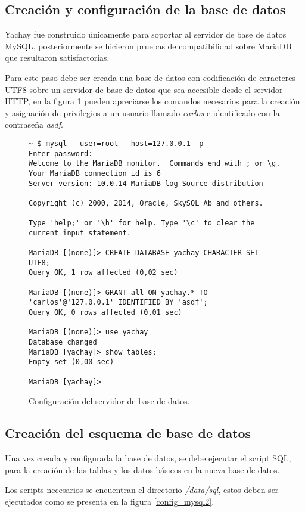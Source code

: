 \subsection{Creación y configuración de la base de datos}
Yachay fue construido únicamente para soportar al servidor de base de datos
MySQL, posteriormente se hicieron pruebas de compatibilidad sobre MariaDB que
resultaron satisfactorias.

Para este paso debe ser creada una base de datos con codificación de caracteres
UTF8 sobre un servidor de base de datos que sea accesible desde el servidor
HTTP, en la figura \ref{config_mysql1} pueden apreciarse los comandos necesarios
para la creación y asignación de privilegios a un usuario llamado \emph{carlos}
e identificado con la contraseña \emph{asdf}.

\begin{figure}
\begin{verbatim}
~ $ mysql --user=root --host=127.0.0.1 -p
Enter password: 
Welcome to the MariaDB monitor.  Commands end with ; or \g.
Your MariaDB connection id is 6
Server version: 10.0.14-MariaDB-log Source distribution

Copyright (c) 2000, 2014, Oracle, SkySQL Ab and others.

Type 'help;' or '\h' for help. Type '\c' to clear the current input statement.

MariaDB [(none)]> CREATE DATABASE yachay CHARACTER SET UTF8;
Query OK, 1 row affected (0,02 sec)

MariaDB [(none)]> GRANT all ON yachay.* TO 'carlos'@'127.0.0.1' IDENTIFIED BY 'asdf';
Query OK, 0 rows affected (0,01 sec)

MariaDB [(none)]> use yachay
Database changed
MariaDB [yachay]> show tables;
Empty set (0,00 sec)

MariaDB [yachay]> 
\end{verbatim}
\caption{Configuración del servidor de base de datos.}
\label{config_mysql1}
\end{figure}

\subsection{Creación del esquema de base de datos}
Una vez creada y configurada la base de datos, se debe ejecutar el script SQL,
para la creación de las tablas y los datos básicos en la nueva base de datos.

Los scripts necesarios se encuentran el directorio \emph{/data/sql}, estos deben
ser ejecutados como se presenta en la figura \ref{config_mysql2}.

